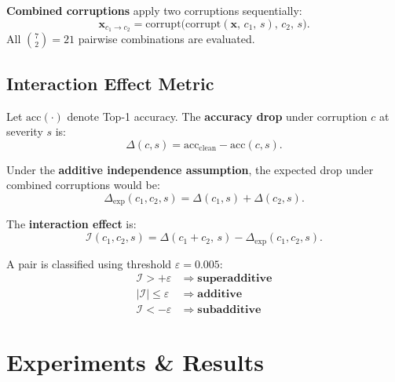 \documentclass[10pt, twocolumn]{article}
\newcommand{\cI}{\mathcal{I}}          %
\begin{document}
\textbf{Combined corruptions} apply two corruptions
sequentially:
\begin{equation}
  \mathbf{x}_{c_1 \to c_2}
  = \mathrm{corrupt}\!\bigl(
      \mathrm{corrupt}(\mathbf{x},\, c_1,\, s),\,
      c_2,\, s
    \bigr).
  \label{eq:combined}
\end{equation}
All $\binom{7}{2}=21$ pairwise combinations are evaluated.

\subsection{Interaction Effect Metric}
\label{sec:metric}

Let $\mathrm{acc}(\cdot)$ denote Top-1 accuracy.
The \textbf{accuracy drop} under corruption $c$ at severity
$s$ is:
\begin{equation}
  \Delta(c,s)
  = \mathrm{acc}_{\mathrm{clean}} - \mathrm{acc}(c,s).
  \label{eq:drop}
\end{equation}

Under the \textbf{additive independence assumption}, the
expected drop under combined corruptions would be:
\begin{equation}
  \Delta_{\mathrm{exp}}(c_1,c_2,s)
  = \Delta(c_1,s) + \Delta(c_2,s).
  \label{eq:expected}
\end{equation}

The \textbf{interaction effect} is:
\begin{equation}
  \cI(c_1,c_2,s)
  = \Delta(c_1{+}c_2,\,s)
    - \Delta_{\mathrm{exp}}(c_1,c_2,s).
  \label{eq:interaction}
\end{equation}

A pair is classified using threshold $\varepsilon = 0.005$:
\begin{align*}
  \cI >  +\varepsilon &\;\Rightarrow\;
    \textbf{superadditive} \\
  |\cI| \le \varepsilon &\;\Rightarrow\;
    \textbf{additive} \\
  \cI < -\varepsilon &\;\Rightarrow\;
    \textbf{subadditive}
\end{align*}

\section{Experiments \& Results}
\label{sec:experiments}
\end{document}
